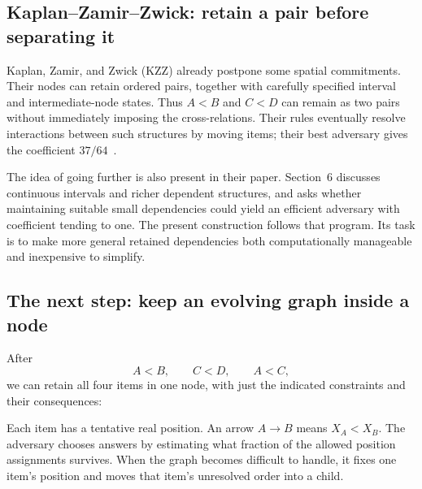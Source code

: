 \subsection{Kaplan--Zamir--Zwick: retain a pair before separating it}

Kaplan, Zamir, and Zwick (KZZ) already postpone some spatial commitments. Their nodes can retain ordered pairs, together with carefully specified interval and intermediate-node states. Thus \(A<B\) and \(C<D\) can remain as two pairs without immediately imposing the cross-relations. Their rules eventually resolve interactions between such structures by moving items; their best adversary gives the coefficient \(37/64\)~\cite{kzz}.

The idea of going further is also present in their paper. Section~6 discusses continuous intervals and richer dependent structures, and asks whether maintaining suitable small dependencies could yield an efficient adversary with coefficient tending to one. The present construction follows that program. Its task is to make more general retained dependencies both computationally manageable and inexpensive to simplify.

\subsection{The next step: keep an evolving graph inside a node}

After
\[
A<B,\qquad C<D,\qquad A<C,
\]
we can retain all four items in one node, with just the indicated constraints and their consequences:

\begin{center}
\end{center}

Each item has a tentative real position. An arrow \(A\to B\) means \(X_A<X_B\). The adversary chooses answers by estimating what fraction of the allowed position assignments survives. When the graph becomes difficult to handle, it fixes one item's position and moves that item's unresolved order into a child.

